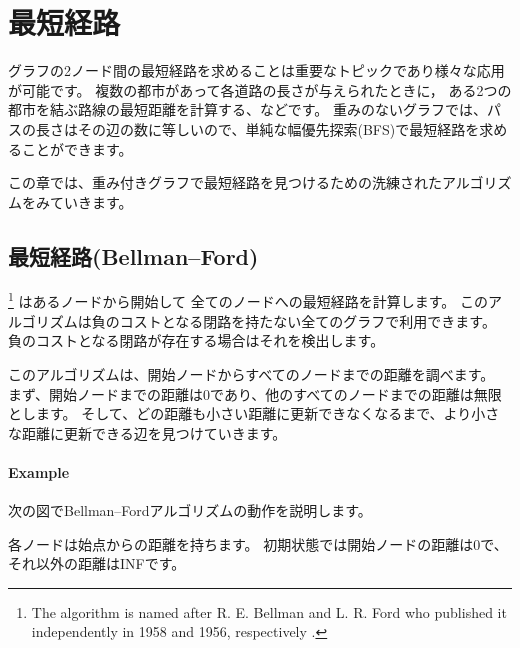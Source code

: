 \chapter{最短経路}


グラフの2ノード間の最短経路を求めることは重要なトピックであり様々な応用が可能です。
複数の都市があって各道路の長さが与えられたときに，
ある2つの都市を結ぶ路線の最短距離を計算する、などです。
重みのないグラフでは、パスの長さはその辺の数に等しいので、単純な幅優先探索(BFS)で最短経路を求めることができます。

この章では、重み付きグラフで最短経路を見つけるための洗練されたアルゴリズムをみていきます。

\section{最短経路(Bellman–Ford)}


\footnote{The algorithm is named after
R. E. Bellman and L. R. Ford who published it independently
in 1958 and 1956, respectively \cite{bel58,for56a}.} はあるノードから開始して
全てのノードへの最短経路を計算します。
このアルゴリズムは負のコストとなる閉路を持たない全てのグラフで利用できます。
負のコストとなる閉路が存在する場合はそれを検出します。

このアルゴリズムは、開始ノードからすべてのノードまでの距離を調べます。
まず、開始ノードまでの距離は0であり、他のすべてのノードまでの距離は無限とします。
そして、どの距離も小さい距離に更新できなくなるまで、より小さな距離に更新できる辺を見つけていきます。

\subsubsection{Example}

次の図でBellman–Fordアルゴリズムの動作を説明します。
\begin{center}
\end{center}
各ノードは始点からの距離を持ちます。
初期状態では開始ノードの距離は0で、それ以外の距離はINFです。

